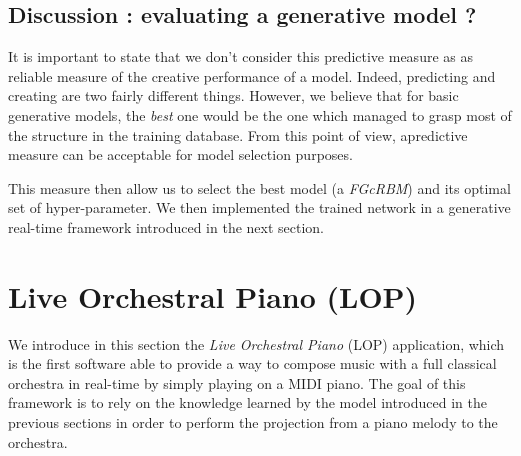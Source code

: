 \documentclass[letterpaper]{article}
\begin{document}

\subsection{Discussion : evaluating a generative model ?}
It is important to state that we don't consider this predictive measure as as reliable measure of the creative performance of a model. Indeed, predicting and creating are two fairly different things. However, we believe that for basic generative models, the \textit{best} one would be the one which managed to grasp most of the structure in the training database. From this point of view, apredictive measure can be acceptable for model selection purposes.

This measure then allow us to select the best model (a \textit{FGcRBM}) and its optimal set of hyper-parameter. We then implemented the trained network in a generative real-time framework introduced in the next section.

\section{Live Orchestral Piano (LOP)}
We introduce in this section the \emph{Live Orchestral Piano} (LOP)
application, which is the first software able to provide a way to
compose music with a full classical orchestra in real-time by simply
playing on a MIDI piano. The goal of this framework is to rely on
the knowledge learned by the model introduced in the previous sections
in order to perform the projection from a piano melody to the orchestra.
\end{document}

